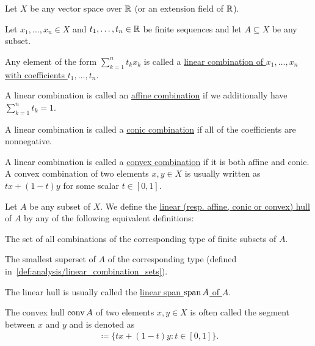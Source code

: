 Let $X$ be any vector space over $\mathbb R$ (or an extension field of $\mathbb R$).

\begin{definition}\label{def:analysis/linear_combinations}
  Let $x_1, \ldots, x_n \in X$ and $t_1, \ldots, t_n \in \mathbb R$ be finite sequences and let $A \subseteq X$ be any subset.

  \begin{defenum}
    \item Any element of the form $\sum_{k=1}^n t_k x_k$ is called a \uline{linear combination of $x_1, \ldots, x_n$ with coefficients $t_1, \ldots, t_n$}.
    \item A linear combination is called an \uline{affine combination} if we additionally have $\sum_{k=1}^n t_k = 1$.
    \item A linear combination is called a \uline{conic combination} if all of the coefficients are nonnegative.
    \item A linear combination is called a \uline{convex combination} if it is both affine and conic. A convex combination of two elements $x, y \in X$ is usually written as $tx + (1-t)y$ for some scalar $t \in [0, 1]$.
  \end{defenum}
\end{definition}

\begin{definition}\label{def:analysis:fund:hulls}
  Let $A$ be any subset of $X$. We define the \uline{linear (resp. affine, conic or convex) hull} of $A$ by any of the following equivalent definitions:
  \begin{defenum}
    \item The set of all combinations of the corresponding type of finite subsets of $A$.
    \item The smallest superset of $A$ of the corresponding type (defined in~\cref{def:analysis/linear_combination_sets}).
  \end{defenum}

  The linear hull is usually called the \uline{linear span $\operatorname{span} A$ of $A$}.

  The convex hull $\operatorname{conv} A$ of two elements $x, y \in X$ is often called the segment between $x$ and $y$ and is denoted as
  \begin{align*}
    [x, y] \coloneqq \{ tx + (1-t)y \colon t \in [0, 1] \}.
  \end{align*}
\end{definition}


